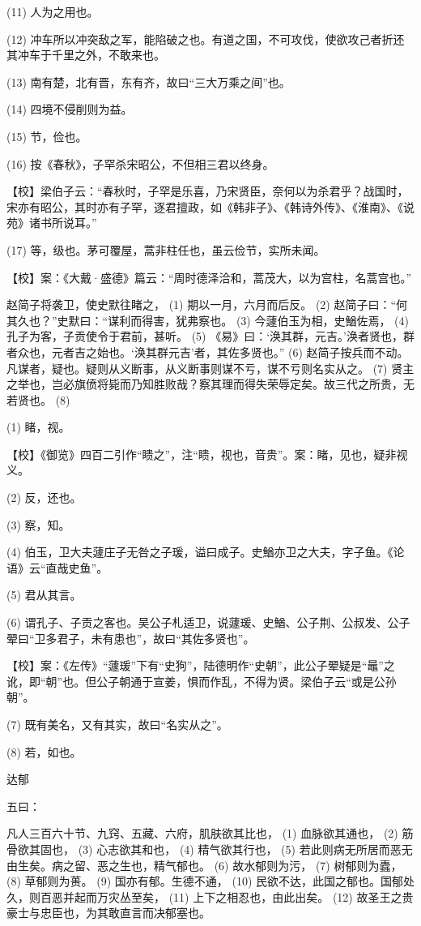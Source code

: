 \documentclass[12pt,UTF8]{ctexbook}
\begin{document}
(11) 人为之用也。

(12) 冲车所以冲突敌之军，能陷破之也。有道之国，不可攻伐，使欲攻己者折还其冲车于千里之外，不敢来也。

(13) 南有楚，北有晋，东有齐，故曰“三大万乘之间”也。

(14) 四境不侵削则为益。

(15) 节，俭也。

(16) 按《春秋》，子罕杀宋昭公，不但相三君以终身。

【校】梁伯子云：“春秋时，子罕是乐喜，乃宋贤臣，奈何以为杀君乎？战国时，宋亦有昭公，其时亦有子罕，逐君擅政，如《韩非子》、《韩诗外传》、《淮南》、《说苑》诸书所说耳。”

(17) 等，级也。茅可覆屋，蒿非柱任也，虽云俭节，实所未闻。

【校】案：《大戴·盛德》篇云：“周时德泽洽和，蒿茂大，以为宫柱，名蒿宫也。”

赵简子将袭卫，使史默往睹之， (1) 期以一月，六月而后反。 (2) 赵简子曰：“何其久也？”史默曰：“谋利而得害，犹弗察也。 (3) 今蘧伯玉为相，史鰌佐焉， (4) 孔子为客，子贡使令于君前，甚听。 (5) 《易》曰：‘涣其群，元吉。’涣者贤也，群者众也，元者吉之始也。‘涣其群元吉’者，其佐多贤也。” (6) 赵简子按兵而不动。凡谋者，疑也。疑则从义断事，从义断事则谋不亏，谋不亏则名实从之。 (7) 贤主之举也，岂必旗偾将毙而乃知胜败哉？察其理而得失荣辱定矣。故三代之所贵，无若贤也。 (8)

(1) 睹，视。

【校】《御览》四百二引作“瞆之”，注“瞆，视也，音贵”。案：睹，见也，疑非视义。

(2) 反，还也。

(3) 察，知。

(4) 伯玉，卫大夫蘧庄子无咎之子瑗，谥曰成子。史鰌亦卫之大夫，字子鱼。《论语》云“直哉史鱼”。

(5) 君从其言。

(6) 谓孔子、子贡之客也。吴公子札适卫，说蘧瑗、史鰌、公子荆、公叔发、公子翚曰“卫多君子，未有患也”，故曰“其佐多贤也”。

【校】案：《左传》“蘧瑗”下有“史狗”，陆德明作“史朝”，此公子翚疑是“鼂”之讹，即“朝”也。但公子朝通于宣姜，惧而作乱，不得为贤。梁伯子云“或是公孙朝”。

(7) 既有美名，又有其实，故曰“名实从之”。

(8) 若，如也。





达郁


五曰：

凡人三百六十节、九窍、五藏、六府，肌肤欲其比也， (1) 血脉欲其通也， (2) 筋骨欲其固也， (3) 心志欲其和也， (4) 精气欲其行也， (5) 若此则病无所居而恶无由生矣。病之留、恶之生也，精气郁也。 (6) 故水郁则为污， (7) 树郁则为蠹， (8) 草郁则为蒉。 (9) 国亦有郁。生德不通， (10) 民欲不达，此国之郁也。国郁处久，则百恶并起而万灾丛至矣， (11) 上下之相忍也，由此出矣。 (12) 故圣王之贵豪士与忠臣也，为其敢直言而决郁塞也。
\end{document}
